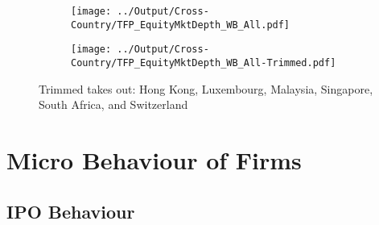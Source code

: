 \documentclass[12pt,notitlepage]{article}
\begin{document}
\begin{figure}[!htpb]
\centering
\caption{Total Factor Productivity (All Countries)}
\begin{subfigure}{.49\textwidth}
    \centering
 \texttt{[image: ../Output/Cross-Country/TFP\_EquityMktDepth\_WB\_All.pdf]}
\end{subfigure}
\begin{subfigure}{.49\textwidth}
    \centering
  \texttt{[image: ../Output/Cross-Country/TFP\_EquityMktDepth\_WB\_All-Trimmed.pdf]}
\end{subfigure}
Trimmed takes out: Hong Kong, Luxembourg, Malaysia, Singapore, South Africa, and Switzerland
\end{figure}





\FloatBarrier
\section{Micro Behaviour of Firms} %
\label{sec:micro_behaviour_of_firms}
\subsection{IPO Behaviour} %
\label{sec:ipo_behaviour}
\FloatBarrier


\begin{table}[!htpb]
\caption{Number of data points x years after an IPO}
    \begin{center}
    \end{center}
\end{table}
\end{document}
